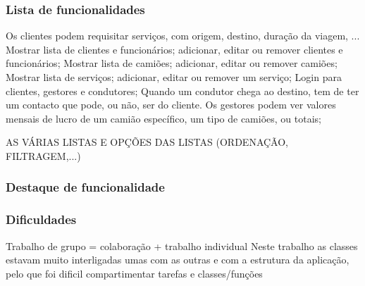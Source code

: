 \documentclass{beamer}
\def\\{}
\begin{document}
\begin{frame}
\frametitle{Lista de funcionalidades} 
Os clientes podem requisitar serviços, com origem, destino, duração da viagem, ...\\
Mostrar lista de clientes e funcionários; adicionar, editar ou remover clientes e funcionários;\\
Mostrar lista de camiões; adicionar, editar ou remover camiões; \\
Mostrar lista de serviços; adicionar, editar ou remover um serviço;\\
Login para clientes, gestores e condutores;\\
Quando um condutor chega ao destino, tem de ter um contacto que pode, ou não, ser do cliente.\\
Os gestores podem ver valores mensais de lucro de um camião específico, um tipo de camiões, ou totais;\\
\end{frame}

\begin{frame}
AS VÁRIAS LISTAS E OPÇÕES DAS LISTAS (ORDENAÇÃO, FILTRAGEM,...)
\end{frame}

\begin{frame}
\frametitle{Destaque de funcionalidade}
\end{frame}

\begin{frame}
\frametitle{Dificuldades}
Trabalho de grupo = colaboração + trabalho individual\\
Neste trabalho as classes estavam muito interligadas umas com as outras e com a estrutura da aplicação, pelo que foi dificil compartimentar tarefas e classes/funções
\end{frame}
\end{document}
